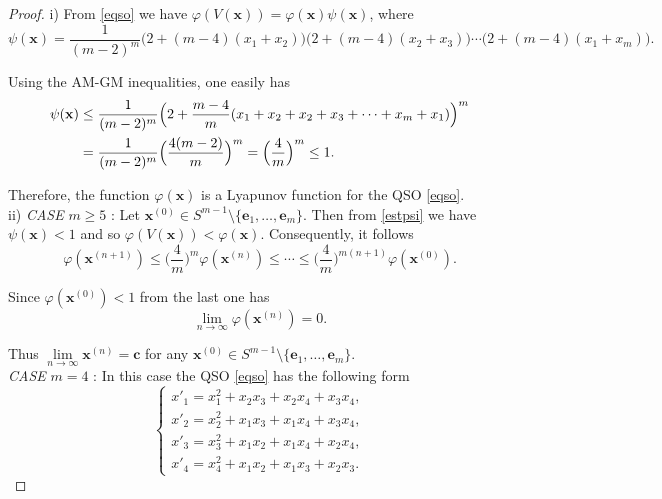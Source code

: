 \documentclass[11pt,reqno]{amsart}
\numberwithin{equation}{section} \setcounter{tocdepth}{1}
\begin{document}
\begin{proof} i) From  \eqref{eqso} we have $\varphi(V(\mathbf{x})) =\varphi(\mathbf{x}) \psi(\mathbf{x})$, where
\begin{equation*}
 \psi(\mathbf{x})=\frac{1}{(m-2)^m}\big(2 +(m-4)(x_1+x_2)\big)\big(2 +(m-4)(x_2+x_3)\big)\cdots \big(2 +(m-4)(x_1+x_m)\big).
\end{equation*}

Using the AM-GM inequalities, one easily has
\begin{align}\label{estpsi}
\psi(\mathbf{x})&\leq \frac{1}{(m-2)^m} \Big(2 +\frac{m-4}{m}(x_1+x_2+x_2+x_3+\cdots+x_m+x_1)\Big)^m\notag\\
&=\frac{1}{(m-2)^m}   \Big(\frac{4(m-2)}{m}\Big)^m=\Big(\frac{4}{m}\Big)^m\leq 1.
\end{align}

Therefore, the function $\varphi(\mathbf{x})$ is a Lyapunov function for the QSO \eqref{eqso}.\\

ii)  {\it CASE} $m\geq5$ : Let $\mathbf{x}^{(0)}\in S^{m-1}\setminus \{\mathbf{e}_1,\dots,\mathbf{e}_m\}$. Then
from \eqref{estpsi} we have $\psi(\mathbf{x})<1$ and so $\varphi(V(\mathbf{x})) <\varphi(\mathbf{x})$.
Consequently, it follows
\[\varphi(\mathbf{x}^{(n+1)})\leq \Big(\frac{4}{ m}\Big)^m \varphi(\mathbf{x}^{(n)})\leq \cdots
\leq \Big(\frac{4}{m}\Big)^{m(n+1)} \varphi(\mathbf{x}^{(0)}). \]

Since $\varphi(\mathbf{x}^{(0)})<1$ from the last one has
\[\lim\limits_{n\rightarrow\infty} \varphi(\mathbf{x}^{(n)})=0.\]

Thus $\lim\limits_{n\rightarrow\infty}\mathbf{x}^{(n)}=\mathbf{c}$ for any $\mathbf{x}^{(0)}\in S^{m-1}\setminus \{\mathbf{e}_1,\dots,\mathbf{e}_m\}$.\\

{\it CASE} $m=4$ : In this case the QSO \eqref{eqso} has the following form
\begin{equation*}
\left\{\begin{array}{llll}
               x'_{1}= x_1^2+x_2x_3+x_2x_4+x_3x_4, \\[2mm]
               x'_{2}= x_2^2+ x_1x_3+x_1x_4+x_3x_4, \\[2mm]
               x'_{3}= x_3^2+ x_1x_2+x_1x_4+x_2x_4, \\[2mm]
               x'_{4}= x_4^2+ x_1x_2+x_1x_3+x_2x_3.
\end{array}\right.
\end{equation*}


\end{proof}
\end{document}
